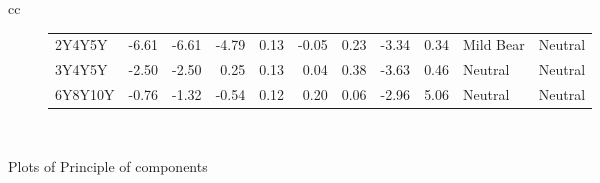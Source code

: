 \documentclass[a4paper,twoside]{report}
\begin{document}
\begin{figure}[htbp]
\begin{tabular}[c]{cc}
\begin{subfigure}[c]{0.5\textwidth}
\begin{adjustbox}{max width=\textwidth}
\begin{tabular}{lrrrrrrrrll}
   2Y4Y5Y &   -6.61 &    -6.61 &     -4.79 &   0.13 & -0.05 &      0.23 &  -3.34 &     0.34 &  Mild Bear &         Neutral \\
   3Y4Y5Y &   -2.50 &    -2.50 &      0.25 &   0.13 &  0.04 &      0.38 &  -3.63 &     0.46 &    Neutral &         Neutral \\
  6Y8Y10Y &   -0.76 &    -1.32 &     -0.54 &   0.12 &  0.20 &      0.06 &  -2.96 &     5.06 &    Neutral &         Neutral \\
\hline
\end{tabular}
\end{adjustbox}
 \end{subfigure}\\
 
 
 
\end{tabular}
 \caption{Plots of Principle of components}\label{fig:bubble plots}
 \end{figure} 
 
 
 
 
 
 
 
\end{document}
